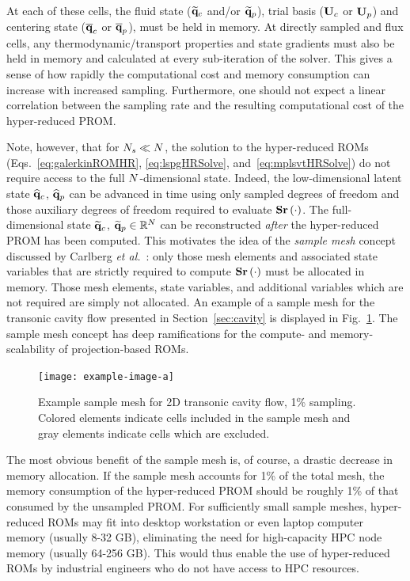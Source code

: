 At each of these cells, the fluid state ($\mathbf{\widetilde{q}}_{c}$ and/or $\mathbf{\widetilde{q}}_{p}$), trial basis ($\consTrial$ or $\primTrial$) and centering state ($\mathbf{\overline{q}}_{c}$ or $\mathbf{\overline{q}}_{p}$), must be held in memory. At directly sampled and flux cells, any thermodynamic/transport properties and state gradients must also be held in memory and calculated at every sub-iteration of the solver. This gives a sense of how rapidly the computational cost and memory consumption can increase with increased sampling. Furthermore, one should not expect a linear correlation between the sampling rate and the resulting computational cost of the hyper-reduced PROM.

Note, however, that for $N_s \ll N$, the solution to the hyper-reduced ROMs (Eqs.~\ref{eq:galerkinROMHR}, \ref{eq:lspgHRSolve}, and~\ref{eq:mplsvtHRSolve}) do not require access to the full $N$-dimensional state. Indeed, the low-dimensional latent state $\mathbf{\widehat{q}}_{c}$, $\mathbf{\widehat{q}}_{p}$ can be advanced in time using only sampled degrees of freedom and those auxiliary degrees of freedom required to evaluate $\mathbf{S} \mathbf{r}\left(\cdot\right)$. The full-dimensional state $\mathbf{\widetilde{q}}_{c}$, $\mathbf{\widetilde{q}}_{p} \in \mathbb{R}^{N}$ can be reconstructed \textit{after} the hyper-reduced PROM has been computed. This motivates the idea of the \textit{sample mesh} concept discussed by Carlberg \textit{et al.}~\cite{Carlberg2013}: only those mesh elements and associated state variables that are strictly required to compute $\mathbf{S} \mathbf{r}\left(\cdot\right)$ must be allocated in memory. Those mesh elements, state variables, and additional variables which are not required are simply not allocated. An example of a sample mesh for the transonic cavity flow presented in Section~\ref{sec:cavity} is displayed in Fig.~\ref{fig:sampMeshExample}. The sample mesh concept has deep ramifications for the compute- and memory-scalability of projection-based ROMs.

\begin{figure}
	\centering
	\texttt{[image: example-image-a]}
	\caption{\label{fig:sampMeshExample}Example sample mesh for 2D transonic cavity flow, 1\% sampling. Colored elements indicate cells included in the sample mesh and gray elements indicate cells which are excluded.}
\end{figure}

The most obvious benefit of the sample mesh is, of course, a drastic decrease in memory allocation. If the sample mesh accounts for 1\% of the total mesh, the memory consumption of the hyper-reduced PROM should be roughly 1\% of that consumed by the unsampled PROM. For sufficiently small sample meshes, hyper-reduced ROMs may fit into desktop workstation or even laptop computer memory (usually 8-32 GB), eliminating the need for high-capacity HPC node memory (usually 64-256 GB). This would thus enable the use of hyper-reduced ROMs by industrial engineers who do not have access to HPC resources.

